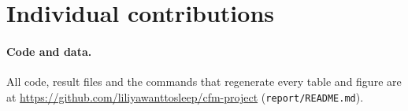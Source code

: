 \section*{Individual contributions}

\paragraph{Code and data.} All code, result files and the commands that regenerate every table and figure are at \url{https://github.com/liliyawanttosleep/cfm-project} (\texttt{report/README.md}).
